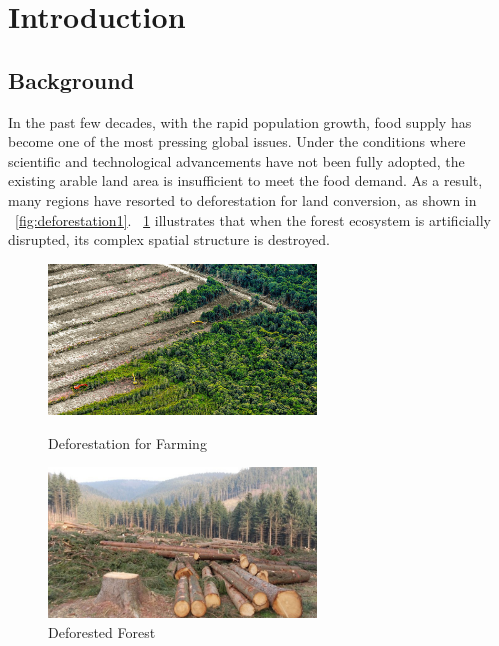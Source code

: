 \documentclass{HZNUMCM}
\begin{document}
\showSummarySheet
\showContents

  \section{Introduction}
    \subsection{Background}
    In the past few decades, with the rapid population growth, 
    food supply has become one of the most pressing global issues. 
    Under the conditions where scientific and technological advancements have not been fully adopted, 
    the existing arable land area is insufficient to meet the food demand. 
    As a result, many regions have resorted to deforestation for land conversion, 
    as shown in \figurename~\ref{fig:deforestation1}. \figurename~\ref{fig:deforestation2} illustrates that when the forest ecosystem is artificially disrupted, 
    its complex spatial structure is destroyed.
    \begin{figure}[H]
      \centering
        \begin{minipage}[b]{0.45\linewidth}
            \centering
            \includegraphics[height=4cm, keepaspectratio]{images/deforestation1.jpg} %
            \caption{Deforestation for Farming}
            \label{fig:deforestation1}
        \end{minipage}
      \hspace{0.05\linewidth}
        \begin{minipage}[b]{0.45\linewidth}
            \centering
            \includegraphics[height=4cm, keepaspectratio]{images/deforestation2.jpg} %
            \caption{Deforested Forest}
            \label{fig:deforestation2}
        \end{minipage}
      \end{figure}
\end{document}
